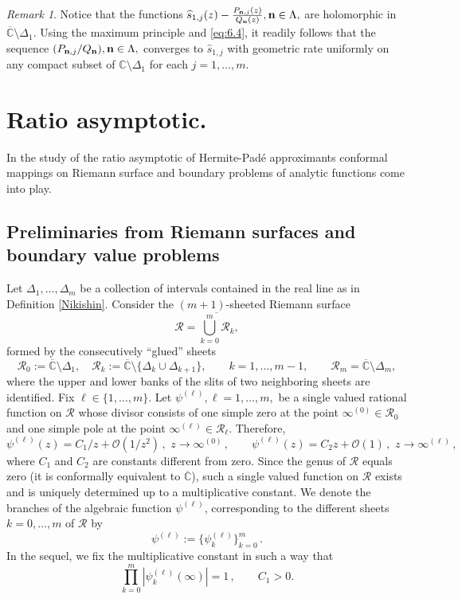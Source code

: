 \documentclass{amsart}
\theoremstyle{definition}
\theoremstyle{remark}
\newtheorem{rem}[teo]{\sc Remark}
\begin{document}
\begin{rem} Notice that the functions $\widehat{s}_{1,j}(z) - \frac{P_{{\bf n},j}(z)}{Q_{\bf n}(z)}, {\bf n} \in \Lambda, $ are holomorphic in $\overline{\mathbb{C}} \setminus \Delta_1$. Using the maximum principle and \eqref{eq:6.4}, it readily follows that the sequence $({P_{{\bf n},j}}/{Q_{\bf n}}), {\bf n} \in \Lambda,$ converges to $\widehat{s}_{1,j}$   with geometric rate uniformly on any compact subset of $\mathbb{C} \setminus \Delta_1$ for each $j=1,\ldots,m$.
\end{rem}

\section{Ratio asymptotic.}

In the study of the ratio asymptotic of Hermite-Pad\'e approximants conformal mappings on Riemann surface and boundary problems of analytic functions come into play.

\subsection{Preliminaries from Riemann surfaces and boundary value problems}

Let $\Delta_1,\ldots,\Delta_m$ be a collection of intervals contained in the real line as in Definition \ref{Nikishin}. Consider the $(m+1)$-sheeted Riemann surface
$$
\mathcal R=\overline{\bigcup_{k=0}^m \mathcal R_k} ,
$$
formed by the consecutively ``glued'' sheets
$$
\mathcal R_0:=\overline {\mathbb{C}} \setminus \Delta_1,\quad
\mathcal R_k:=\overline {\mathbb{C}} \setminus \{\Delta_k \cup
\Delta_{k+1}\},\qquad k=1,\dots,m-1,\qquad \mathcal R_m=\overline
{\mathbb{C}} \setminus \Delta_m,
$$
where the upper and lower banks of the slits of two neighboring
sheets are identified. Fix $\ell \in \{1,\ldots,m\}$.  Let
$\psi^{(\ell)}, \ell=1,\ldots,m,$ be a single valued rational function
on $\mathcal{R}$ whose divisor consists of one simple zero at the
point $\infty^{(0)} \in \mathcal R_0$ and one simple pole at the
point $\infty^{(\ell)} \in \mathcal R_\ell$. Therefore,
\begin{equation}            \label{eq:psi}
\psi^{(\ell)}(z) = C_1/z + \mathcal{O}(1/z^2)\,,\,\,z \to
\infty^{(0)}\,, \qquad  \psi^{(\ell)}(z) = C_2 z +
\mathcal{O}(1)\,,\,\,z \to \infty^{(\ell)} \,,
\end{equation}
where $C_1$ and $C_2$ are constants different from zero.  Since
the genus of $\mathcal R$ equals zero (it is conformally equivalent to $\overline{\mathbb{C}}$), such a single valued
function on $\mathcal R$ exists and is uniquely determined up to a
multiplicative constant. We denote the branches of the algebraic
function $\psi^{(\ell)}$, corresponding to the different sheets $k =
0,\ldots,m$ of $\mathcal R$ by
$$
\psi^{(\ell)}:=\{\psi_k^{(\ell)}\}_{k=0}^m\,.
$$
In the sequel, we fix the multiplicative constant in such a way
that
\begin{equation} \label{eq:normaliz}
\prod_{k=0}^m |\psi_k^{(\ell)}(\infty)| = 1\,, \qquad C_1 > 0.
\end{equation}
\end{document}
